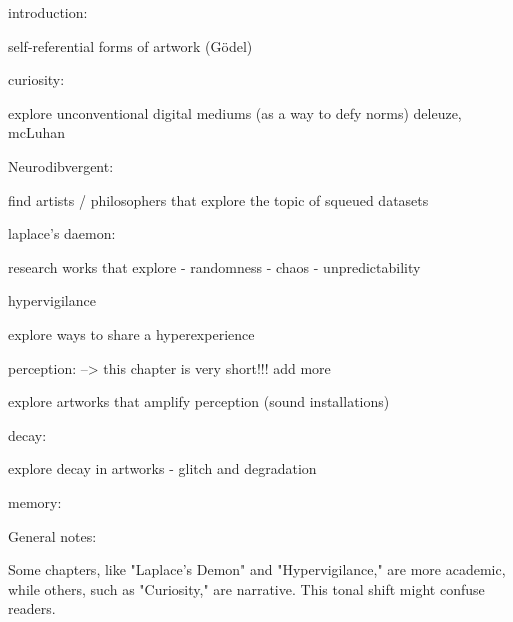


introduction:

self-referential forms of artwork
(Gödel)

curiosity:

explore unconventional digital mediums (as a way to defy norms)
deleuze, mcLuhan

Neurodibvergent:

find artists / philosophers that explore the topic of squeued datasets 


laplace's daemon:

research works that explore 
- randomness 
- chaos 
- unpredictability 

hypervigilance

explore ways to share a hyperexperience
 

perception: --> this chapter is very short!!! add more

explore artworks that amplify perception 
(sound installations)

decay:

explore decay in artworks 
 - glitch and degradation 


 memory: 



General notes: 

Some chapters, like "Laplace’s Demon" and "Hypervigilance," are more academic, while others, such as "Curiosity," are narrative. This tonal shift might confuse readers.